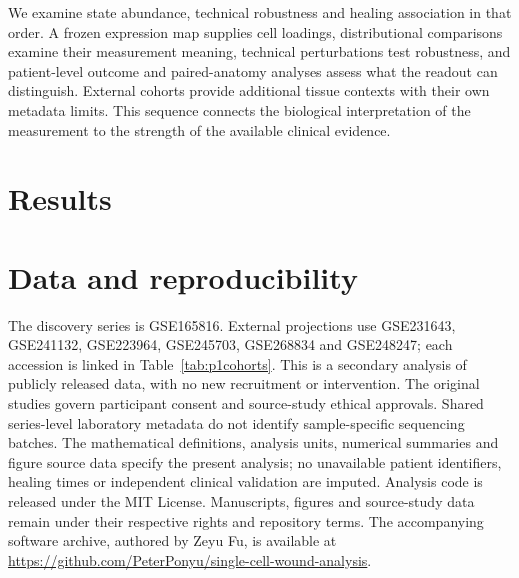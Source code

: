 \documentclass[10pt,a4paper]{article}
\begin{document}
We examine state abundance, technical robustness and healing association in that order. A frozen expression map supplies cell loadings, distributional comparisons examine their measurement meaning, technical perturbations test robustness, and patient-level outcome and paired-anatomy analyses assess what the readout can distinguish. External cohorts provide additional tissue contexts with their own metadata limits. This sequence connects the biological interpretation of the measurement to the strength of the available clinical evidence.

\section{Results}

\FloatBarrier



\section*{Data and reproducibility}
The discovery series is GSE165816. External projections use GSE231643, GSE241132, GSE223964, GSE245703, GSE268834 and GSE248247; each accession is linked in Table~\ref{tab:p1cohorts}. This is a secondary analysis of publicly released data, with no new recruitment or intervention. The original studies govern participant consent and source-study ethical approvals. Shared series-level laboratory metadata do not identify sample-specific sequencing batches. The mathematical definitions, analysis units, numerical summaries and figure source data specify the present analysis; no unavailable patient identifiers, healing times or independent clinical validation are imputed.
Analysis code is released under the MIT License. Manuscripts, figures and source-study data remain under their respective rights and repository terms. The accompanying software archive, authored by Zeyu Fu, is available at \url{https://github.com/PeterPonyu/single-cell-wound-analysis}.
\FloatBarrier



\end{document}
